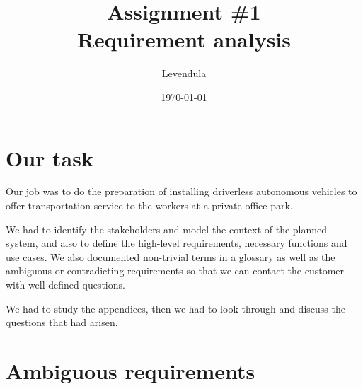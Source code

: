 \documentclass[a4paper]{article}
\title{Assignment \#1 \\ Requirement analysis}
\author{Levendula}
\date{\today}
\begin{document}


\tableofcontents
\clearpage

\section{Our task}



Our job was to do the preparation of installing \gls{driverless}
\gls{autonomous} \gls{vehicle}s to offer \gls{transportation} service to the
workers at a private office park.

We had to identify the \gls{stakeholder}s and model the context of the planned
system, and also to define the high-level requirements, necessary functions and
use cases. We also documented non-trivial terms in a glossary as well as the
ambiguous or contradicting requirements so that we can contact the customer with
well-defined questions.

We had to study the appendices, then we had to look through and discuss the
questions that had arisen.



\section{Ambiguous requirements}
\end{document}
